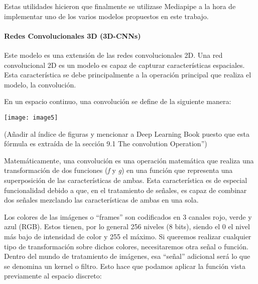 \documentclass{article} %
\begin{document}
\noindent 

\noindent Estas utilidades hicieron que finalmente se utilizase Mediapipe a la hora de implementar uno de los varios modelos propuestos en este trabajo.


\paragraph{ Redes Convolucionales 3D (3D-CNNs)}

\noindent Este modelo es una extensi\'{o}n de las redes convolucionales 2D. Una red convolucional 2D es un modelo es capaz de capturar caracter\'{i}sticas espaciales. Esta caracter\'{i}stica se debe principalmente a la operaci\'{o}n principal que realiza el modelo, la convoluci\'{o}n. 

\noindent 

\noindent En un espacio continuo, una convoluci\'{o}n se define de la siguiente manera:

\noindent 

\noindent \texttt{[image: image5]}

\noindent 

\noindent (A\~{n}adir al \'{i}ndice de figuras y mencionar a Deep Learning Book puesto que esta f\'{o}rmula es extra\'{i}da de la secci\'{o}n 9.1 The convolution Operation'')

\noindent 

\noindent Matem\'{a}ticamente, una convoluci\'{o}n es una operaci\'{o}n matem\'{a}tica que realiza una transformaci\'{o}n de dos funciones (\textit{f }y \textit{g}) en una funci\'{o}n que representa una superposici\'{o}n de las caracter\'{i}sticas de ambas. Esta caracter\'{i}stica es de especial funcionalidad debido a que, en el tratamiento de se\~{n}ales, es capaz de combinar dos se\~{n}ales mezclando las caracter\'{i}sticas de ambas en una sola. 

\noindent 

\noindent Los colores de las im\'{a}genes o ``frames'' son codificados en 3 canales rojo, verde y azul (RGB). Estos tienen, por lo general 256 niveles (8 bits), siendo el 0 el nivel m\'{a}s bajo de intensidad de color y 255 el m\'{a}ximo. Si queremos realizar cualquier tipo de transformaci\'{o}n sobre dichos colores, necesitaremos otra se\~{n}al o funci\'{o}n. Dentro del mundo de tratamiento de im\'{a}genes, esa ``se\~{n}al'' adicional ser\'{a} lo que se denomina un kernel o filtro. Esto hace que podamos aplicar la funci\'{o}n vista previamente al espacio discreto:
\end{document}
